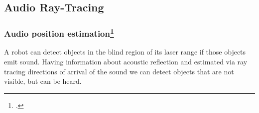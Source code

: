 \documentclass[
    11pt, %
    aspectratio=169, %
]{beamer}
\begin{document}
\subsection{Audio Ray-Tracing}

\begin{frame}
    \frametitle{Audio position estimation\footcite{evenAudioRayTracing2014}}

    A robot can detect objects in the blind region of its laser range if those objects emit sound.
    \newline\newline
    Having information about acoustic reflection and estimated via ray tracing directions of arrival 
    of the sound we can detect objects that are not visible, but can be heard.

\end{frame}


            



	
\end{document}
